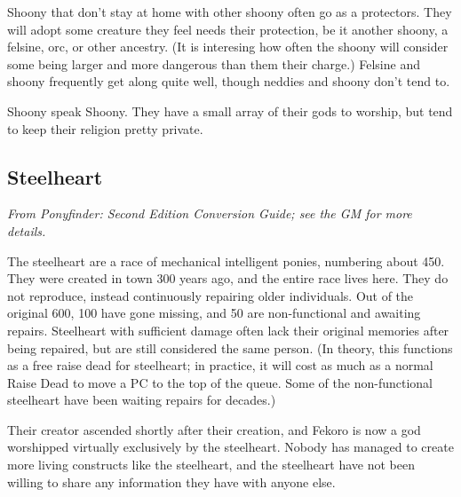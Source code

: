 \documentclass{report}
\begin{document}
Shoony that don't stay at home with other shoony often go as a protectors. They
will adopt some creature they feel needs their protection, be it another shoony,
a felsine, orc, or other ancestry. (It is interesing how often the shoony will
consider some being larger and more dangerous than them their charge.) Felsine and
shoony frequently get along quite well, though neddies and shoony don't tend to.

Shoony speak Shoony. They have a small array of their gods to worship, but tend to
keep their religion pretty private. 

\subsection{Steelheart}

\emph{From \emph{Pony\-finder: Second Edition Conversion Guide}; see the GM
for more details.}

The steelheart are a race of mechanical intelligent ponies, numbering about 450.
They were created in town 300 years ago, and the entire race lives here. They
do not reproduce, instead continuously repairing older individuals. Out of the
original 600, 100 have gone missing, and 50 are non-functional and awaiting
repairs. Steelheart with sufficient damage often lack their original memories
after being repaired, but are still considered the same person. (In theory,
this functions as a free raise dead for steelheart; in practice, it will
cost as much as a normal Raise Dead to move a PC to the top of the queue. Some
of the non-functional steelheart have been waiting repairs for decades.)

Their creator ascended shortly after their creation, and Fekoro is now a god
worshipped virtually exclusively by the steelheart. Nobody has managed to create
more living constructs like the steelheart, and the steelheart have not been
willing to share any information they have with anyone else.
\end{document}
